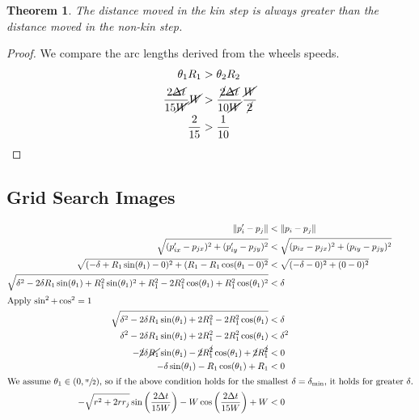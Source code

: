\documentclass[conference]{IEEEtran}
\newtheorem{theorem}{Theorem}
\begin{document}
  \begin{theorem} \label{thm:seg}
    The distance moved in the kin step is always greater than the distance moved in the non-kin step.
  \end{theorem}
  \begin{proof}
    We compare the arc lengths derived from the wheels speeds.
    \begin{align*}
      \theta_1 R_1 &> \theta_2 R_2 \\
      \frac{2\cancel{\Delta t}}{15\cancel{W}} \cancel{W} &> \frac{\cancel{2}\cancel{\Delta t}}{10\cancel{W}} \frac{\cancel{W}}{\cancel{2}} \\
      \frac{2}{15} &> \frac{1}{10} \\
    \end{align*}
  \end{proof}

  \subsection{Grid Search Images} \label{section:grid_search_images}


    \begin{align*}
    \lVert p'_i - p_j \rVert &< \lVert p_i - p_j \rVert \\
    \sqrt{(p'_{ix} - p_{jx})^2 + (p'_{iy} - p_{jy})^2} &< \sqrt{(p_{ix} - p_{jx})^2 + (p_{iy} - p_{jy})^2} \\
    \sqrt{(-\delta+R_1\sin(\theta_1)-0)^2 + (R_1-R_1\cos(\theta_1-0)^2} &< \sqrt{(-\delta-0)^2 + (0-0)^2} \\
    \sqrt{\delta^2-2\delta R_1\sin(\theta_1) + R_1^2\sin(\theta_1)^2 + R_1^2-2R_1^2\cos(\theta_1)+R_1^2\cos(\theta_1)^2} &< \delta \\
    \intertext{Apply $\sin^2+\cos^2=1$}
    \sqrt{\delta^2-2\delta R_1\sin(\theta_1) + 2R_1^2-2R_1^2\cos(\theta_1)} &< \delta \\
    \delta^2-2\delta R_1\sin(\theta_1) + 2R_1^2-2R_1^2\cos(\theta_1) &< \delta^2 \\
    -\cancel{2}\delta \cancel{R_1}\sin(\theta_1) - \cancel{2}R_1^{\cancel{2}}\cos(\theta_1) + \cancel{2}R_1^{\cancel{2}} &< 0 \\
    -\delta \sin(\theta_1) - R_1\cos(\theta_1) + R_1 &< 0 \\
    \intertext{We assume $\theta_1\in(0,\sfrac{\pi}{2})$, so if the above condition holds for the smallest $\delta=\delta_{\text{min}}$, it holds for greater $\delta$.}
    -\sqrt{r^2+2rr_j}\sin\bigg(\frac{2\Delta t}{15W}\bigg) - W\cos\bigg(\frac{2\Delta t}{15W}\bigg) + W &< 0
  \end{align*}
\end{document}
